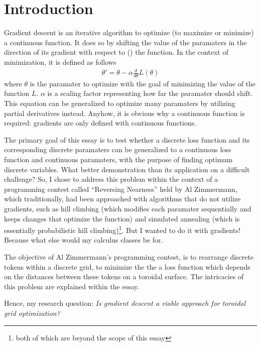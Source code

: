 \section{Introduction}%
\label{sec:introduction}

Gradient descent is an iterative algorithm to optimize (to maximize or minimize) a continuous function. It does so by shifting the value of the paramaters in the direction of its gradient with respect to (\wrt{}) the function. In the context of minimization, it is defined as follows
\begin{align*}
         \theta'=\theta-\alpha \frac{d}{d\theta}L(\theta)
\end{align*}
where $\theta$ is the paramater to optimize with the goal of minimizing the value of the function $L$. $\alpha$ is a scaling factor representing how far the paramater should shift. This equation can be generalized to optimize many paramaters by utilizing partial derivatives instead. Anyhow, it is obvious why a continuous function is required: gradients are only defined with continuous functions.

The primary goal of this essay is to test whether a discrete loss function and its corresponding discrete paramaters can be generalized to a continuous loss function and continuous paramaters, with the purpose of finding optimum discrete variables. What better demonstration than its application on a difficult challenge? So, I chose to address this problem within the context of a programming contest called ``Reversing Nearness'' held by Al Zimmermann, which traditionally, had been approached with algorithms that do not utilize gradients, such as hill climbing (which modifies each paramater sequentially and keeps changes that optimize the function) and simulated annealing (which is essentially probabilistic hill climbing)\footnote{both of which are beyond the scope of this essay}. But I wanted to do it with gradients! Because what else would my calculus classes be for.

The objective of Al Zimmermann's programming contest, is to rearrange discrete tokens within a discrete grid, to minimize the the a loss function which depends on the distances between these tokens on a toroidal surface. The intricacies of this problem are explained within the essay.

Hence, my research question: \emph{Is gradient descent a viable approach for toroidal grid optimization?}

